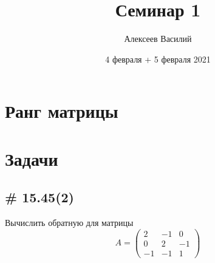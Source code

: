 \documentclass[a4paper,12pt]{article}
\author{Алексеев Василий}
\title{Семинар 1}
\date{4 февраля + 5 февраля 2021}
\begin{document}
  \maketitle
  
  \tableofcontents

  \thispagestyle{empty}
  
  \newpage
  


  \section{Ранг матрицы}
  
  
  \section{Задачи}
  
  
  \subsection{\# 15.45(2)}
  
  Вычислить обратную для матрицы
  \[
    A = \begin{pmatrix}
      2 & -1 & 0\\
      0 & 2 & -1\\
      -1 & -1 & 1
    \end{pmatrix}
  \]
  
\end{document}
